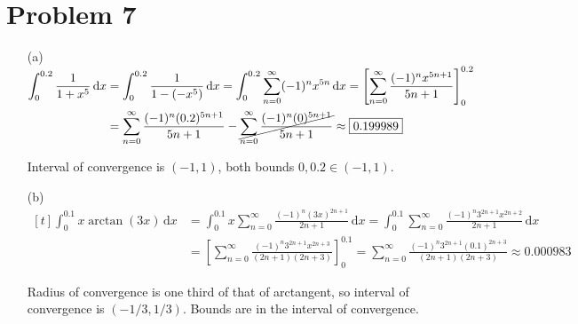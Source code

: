 \documentclass[preview, margin=0.6in]{standalone}
\newcommand*{\problem}[1]{\section*{Problem #1}}
\begin{document}
\problem{7}
\begin{itemize}
	\item[(a)]
		$\begin{aligned}[t]
		    \int_{0}^{0.2}\frac{1}{1+x^5}\,\mathrm{d}x
			&=\int_{0}^{0.2}\frac{1}{1-\left(-x^5\right)}\,\mathrm{d}x
			=\int_{0}^{0.2}\sum_{n=0}^{\infty}(-1)^n x^{5n}\,\mathrm{d}x
			=\left[\sum_{n=0}^{\infty}\frac{(-1)^n x^{5n+1}}{5n+1}\right]_{0}^{0.2} \\
			&=\sum_{n=0}^{\infty}\frac{(-1)^n (0.2)^{5n+1}}{5n+1}-\cancel{\sum_{n=0}^{\infty}\frac{(-1)^n (0)^{5n+1}}{5n+1}}
			\approx \boxed{0.199989}
		\end{aligned}$

		Interval of convergence is $(-1,1)$, both bounds $0,0.2\in(-1,1)$.

	\item[(b)]
		$\begin{aligned}[t]
		    \int_{0}^{0.1}x\arctan(3x)\,\mathrm{d}x
			&=\int_{0}^{0.1}x \sum_{n=0}^{\infty}\frac{(-1)^n (3x)^{2n+1}}{2n+1}\,\mathrm{d}x
			=\int_{0}^{0.1} \sum_{n=0}^{\infty}\frac{(-1)^n 3^{2n+1} x^{2n+2}}{2n+1}\,\mathrm{d}x \\
			&=\left[\sum_{n=0}^{\infty}\frac{(-1)^n 3^{2n+1} x^{2n+3}}{(2n+1)(2n+3)}\right]_{0}^{0.1}
			=\sum_{n=0}^{\infty}\frac{(-1)^n 3^{2n+1} (0.1)^{2n+3}}{(2n+1)(2n+3)}
			\approx \boxed{0.000983}
		\end{aligned}$

		Radius of convergence is one third of that of arctangent, so interval of convergence is $(-1/3,1/3)$. Bounds are in the interval of convergence.

\end{itemize}
\end{document}
